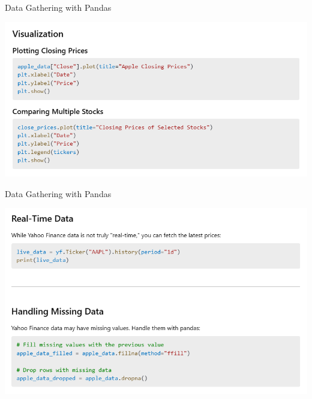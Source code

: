 \documentclass[11pt]{beamer}
\begin{document}
\begin{frame}{Data Gathering with Pandas}
	\begin{center}
	\includegraphics[scale=0.55]{../05-pictures/lesson-1-3_pic_18.png}
	\end{center}
\end{frame}
\begin{frame}{Data Gathering with Pandas}
	\begin{center}
	\includegraphics[scale=0.55]{../05-pictures/lesson-1-3_pic_19.png}
	\end{center}
\end{frame}
\end{document}
